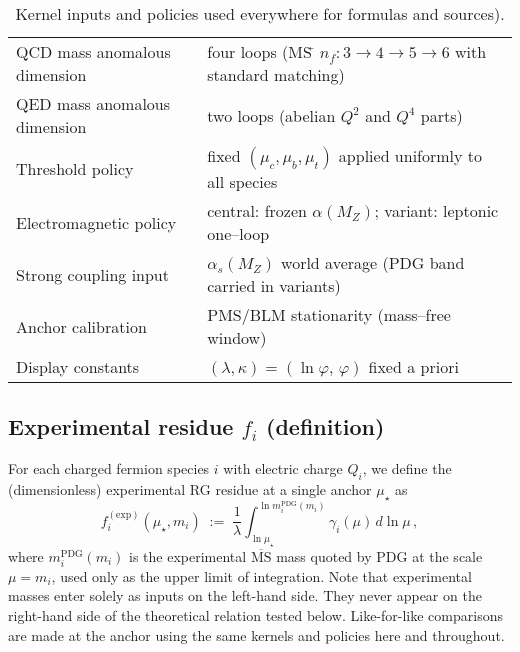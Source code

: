 \documentclass[aps,prd,onecolumn,amsmath,amssymb,superscriptaddress,nofootinbib,showpacs,showkeys]{revtex4-2}
\begin{document}
\begin{table}[h!]
  \centering
  \caption{Kernel inputs and policies used everywhere %
    for formulas and sources).}
  \label{tab:inputs}
  \begin{tabular}{l l}
    \toprule
    QCD mass anomalous dimension & four loops (MS\,\=\; $n_f:3\to4\to5\to6$ with standard matching) \\
    QED mass anomalous dimension & two loops (abelian $Q^2$ and $Q^4$ parts) \\
    Threshold policy & fixed $(\mu_c,\mu_b,\mu_t)$ applied uniformly to all species \\
    Electromagnetic policy & central: frozen $\alpha(M_Z)$; variant: leptonic one–loop \\
    Strong coupling input & $\alpha_s(M_Z)$ world average (PDG band carried in variants) \\
    Anchor calibration & PMS/BLM stationarity (mass–free window) \\
    Display constants & $(\lambda,\kappa)=(\ln\varphi,\,\varphi)$ fixed a priori \\
    \bottomrule
  \end{tabular}
\end{table}

\subsection{Experimental residue \texorpdfstring{$f_i$}{fi} (definition)}
For each charged fermion species $i$ with electric charge $Q_i$, we define the (dimensionless) experimental RG residue at a single anchor $\mu_\star$ as
\begin{equation}
  f_i^{\mathrm{(exp)}}(\mu_\star,m_i)
  \;:=\;\frac{1}{\lambda}\int_{\ln\mu_\star}^{\ln m_i^{\mathrm{PDG}}(m_i)}\gamma_i(\mu)\,d\ln\mu\,,
  \label{eq:def-residue-exp}
\end{equation}
where $m_i^{\mathrm{PDG}}(m_i)$ is the experimental $\overline{\mathrm{MS}}$ mass quoted by PDG at the scale $\mu=m_i$,
used only as the upper limit of integration.
Note that  experimental masses enter solely as inputs on the left-hand side.
They never appear on the right-hand side of the theoretical relation tested below.
Like-for-like comparisons are made at the anchor using the same kernels and policies here and throughout.
\end{document}

